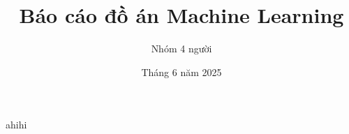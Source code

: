\documentclass{article}
\title{Báo cáo đồ án Machine Learning}
\author{Nhóm 4 người}
\date{Tháng 6 năm 2025}
\begin{document}
\maketitle

ahihi
\end{document}
